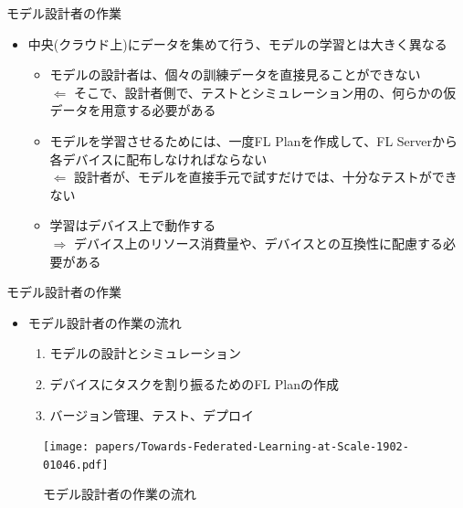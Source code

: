 \documentclass[dvipdfmx,notheorems,t]{beamer}
\begin{document}
\begin{frame}{モデル設計者の作業}

\begin{itemize}
	\item 中央(クラウド上)にデータを集めて行う、モデルの学習とは大きく異なる
	\begin{itemize}
		\item モデルの設計者は、個々の訓練データを直接見ることができない \\
		$\Leftarrow$ そこで、設計者側で、テストとシミュレーション用の、何らかの仮データを用意する必要がある
		\newline
		
		\item モデルを学習させるためには、一度FL Planを作成して、FL Serverから各デバイスに配布しなければならない \\
		$\Leftarrow$ 設計者が、モデルを直接手元で試すだけでは、十分なテストができない
		\newline
		
		\item 学習はデバイス上で動作する \\
		$\Rightarrow$ デバイス上のリソース消費量や、デバイスとの互換性に配慮する必要がある
	\end{itemize}
\end{itemize}

\end{frame}

\begin{frame}{モデル設計者の作業}

\begin{itemize}
	\item モデル設計者の作業の流れ
	\begin{enumerate}
		\item モデルの設計とシミュレーション
		\item デバイスにタスクを割り振るためのFL Planの作成
		\item バージョン管理、テスト、デプロイ
	\end{enumerate}
\end{itemize}

\begin{figure}
	\centering
	\texttt{[image: papers/Towards-Federated-Learning-at-Scale-1902-01046.pdf]}
	\caption{モデル設計者の作業の流れ~\cite{1902.01046}}
	\label{fig:model-engineer-workflow}
\end{figure}

\end{frame}
\end{document}
